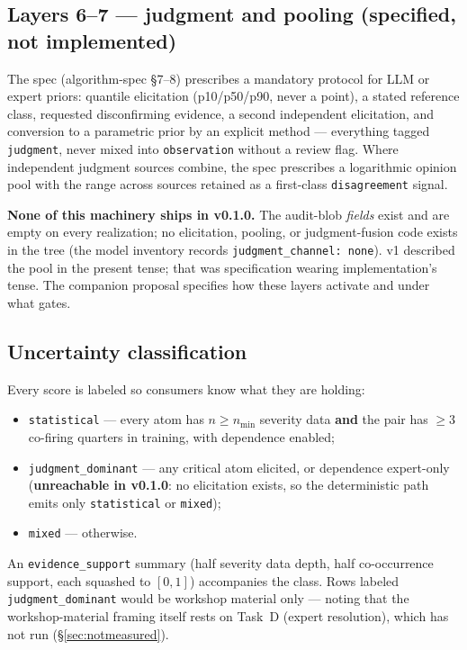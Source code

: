 \documentclass[11pt]{article}
\begin{document}
\subsection{Layers 6--7 --- judgment and pooling (specified, not implemented)}
\label{sec:judgment}

The spec (algorithm-spec \S7--8) prescribes a mandatory protocol for LLM or
expert priors: quantile elicitation (p10/p50/p90, never a point), a stated
reference class, requested disconfirming evidence, a second independent
elicitation, and conversion to a parametric prior by an explicit method ---
everything tagged \texttt{judgment}, never mixed into \texttt{observation}
without a review flag. Where independent judgment sources combine, the spec
prescribes a logarithmic opinion pool with the range across sources retained
as a first-class \texttt{disagreement} signal.

\textbf{None of this machinery ships in v0.1.0.} The audit-blob
\emph{fields} exist and are empty on every realization; no elicitation,
pooling, or judgment-fusion code exists in the tree (the model inventory
records \texttt{judgment\_channel: none}). v1 described the pool in the
present tense; that was specification wearing implementation's tense. The
companion proposal specifies how these layers activate and under what gates.

\subsection{Uncertainty classification}
\label{sec:classes}

Every score is labeled so consumers know what they are holding:

\begin{itemize}[leftmargin=1.4em]
\item \texttt{statistical} --- every atom has $n \ge n_{\min}$ severity data
  \textbf{and} the pair has $\ge 3$ co-firing quarters in training, with
  dependence enabled;
\item \texttt{judgment\_dominant} --- any critical atom elicited, or
  dependence expert-only (\textbf{unreachable in v0.1.0}: no elicitation
  exists, so the deterministic path emits only \texttt{statistical} or
  \texttt{mixed});
\item \texttt{mixed} --- otherwise.
\end{itemize}

An \texttt{evidence\_support} summary (half severity data depth, half
co-occurrence support, each squashed to $[0,1]$) accompanies the class. Rows
labeled \texttt{judgment\_dominant} would be workshop material only ---
noting that the workshop-material framing itself rests on Task~D (expert
resolution), which has not run (\S\ref{sec:notmeasured}).
\end{document}
